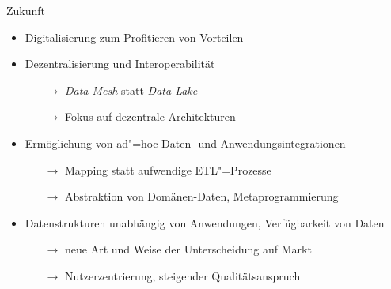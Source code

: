 \begin{frame}{Zukunft}
    \begin{itemize}
        \item Digitalisierung zum Profitieren von Vorteilen

        \item Dezentralisierung und Interoperabilität
        \begin{itemize}
            \item[$\to$] \emph{Data Mesh} statt \emph{Data Lake}
            \item[$\to$] Fokus auf dezentrale Architekturen
        \end{itemize}
        
        \item Ermöglichung von ad"=hoc Daten- und Anwendungsintegrationen
        \begin{itemize}
            \item[$\to$] Mapping statt aufwendige ETL"=Prozesse
            
            \item[$\to$] Abstraktion von Domänen-Daten, Metaprogrammierung
        \end{itemize}
        
        \item Datenstrukturen unabhängig von Anwendungen, Verfügbarkeit von Daten
        \begin{itemize}
            \item[$\to$] neue Art und Weise der Unterscheidung auf Markt
            \item[$\to$] Nutzerzentrierung, steigender Qualitätsanspruch
        \end{itemize}
    \end{itemize}
\end{frame}
